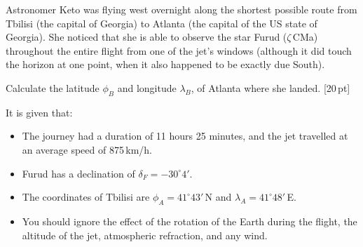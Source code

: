 Astronomer Keto was flying west overnight along the shortest possible route
from Tbilisi (the capital of Georgia) to Atlanta (the capital of the US state
of Georgia). She noticed that she is able to observe the star Furud
($\zeta$\,CMa) throughout the entire flight from one of the jet's windows
(although it did touch the horizon at one point, when it also happened to be
exactly due South).

Calculate the latitude $\phi_B$ and longitude $\lambda_B$, of Atlanta where she
landed. \hfill[20\,pt]

It is given that:
\begin{itemize}
\item The journey had a duration of 11 hours 25 minutes, and the jet travelled
  at an average speed of 875\,km/h.
\item Furud has a declination of $\delta_F = -30^\circ 4'$.
\item The coordinates of Tbilisi are $\phi_A = 41^\circ 43'$\,N and
  $\lambda_A = 41^\circ 48'$\,E.
\item You should ignore the effect of the rotation of the Earth during the
  flight, the altitude of the jet, atmospheric refraction, and any wind.
\end{itemize}
